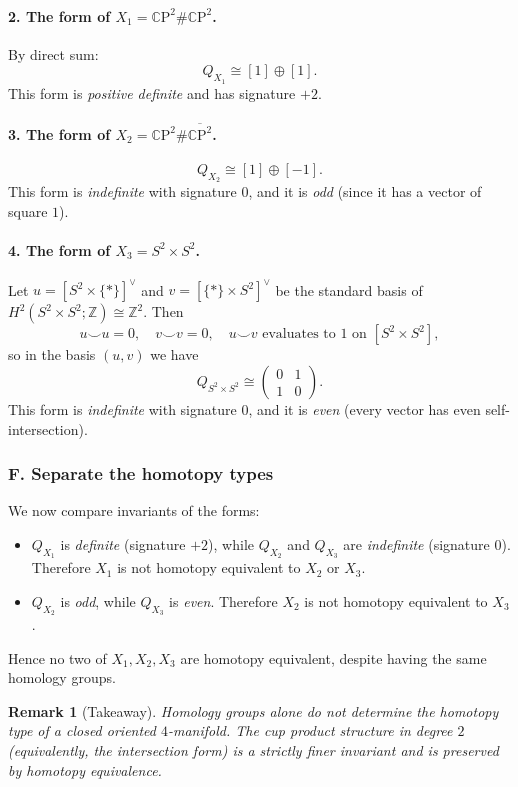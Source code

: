\documentclass[12pt,a4paper]{article}
\theoremstyle{notespace}
\newtheorem{remark}{Remark}[section]
\newcommand{\CP}{\mathbb{C}\mathrm{P}}
\begin{document}
\paragraph{2. The form of $X_1=\CP^2\#\CP^2$.}
By direct sum:
\[
Q_{X_1}\cong [1]\oplus[1].
\]
This form is \emph{positive definite} and has signature $+2$.

\paragraph{3. The form of $X_2=\CP^2\#\overline{\CP^2}$.}
\[
Q_{X_2}\cong [1]\oplus[-1].
\]
This form is \emph{indefinite} with signature $0$, and it is \emph{odd} (since it has a vector of square $1$).

\paragraph{4. The form of $X_3=S^2\times S^2$.}
Let $u=[S^2\times\{\ast\}]^\vee$ and $v=[\{\ast\}\times S^2]^\vee$ be the standard basis of $H^2(S^2\times S^2;\mathbb Z)\cong \mathbb Z^2$. Then
\[
u\smile u = 0,\quad v\smile v=0,\quad u\smile v \text{ evaluates to }1 \text{ on }[S^2\times S^2],
\]
so in the basis $(u,v)$ we have
\[
Q_{S^2\times S^2}\cong
\begin{pmatrix}
	0 & 1\\
	1 & 0
\end{pmatrix}.
\]
This form is \emph{indefinite} with signature $0$, and it is \emph{even} (every vector has even self-intersection).

\subsubsection{F. Separate the homotopy types}

We now compare invariants of the forms:
\begin{itemize}
	\item $Q_{X_1}$ is \emph{definite} (signature $+2$), while $Q_{X_2}$ and $Q_{X_3}$ are \emph{indefinite} (signature $0$). Therefore $X_1$ is not homotopy equivalent to $X_2$ or $X_3$.
	\item $Q_{X_2}$ is \emph{odd}, while $Q_{X_3}$ is \emph{even}. Therefore $X_2$ is not homotopy equivalent to $X_3$.
\end{itemize}
Hence no two of $X_1,X_2,X_3$ are homotopy equivalent, despite having the same homology groups.

\begin{remark}[Takeaway]
	Homology groups alone do not determine the homotopy type of a closed oriented $4$-manifold. The \emph{cup product structure} in degree $2$ (equivalently, the intersection form) is a strictly finer invariant and is preserved by homotopy equivalence.
\end{remark}
\end{document}
